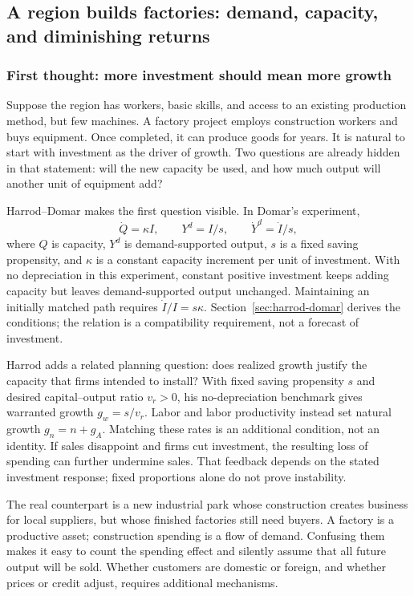 \subsection{A region builds factories: demand, capacity, and diminishing returns}

\subsubsection{First thought: more investment should mean more growth}

Suppose the region has workers, basic skills, and access to an existing
production method, but few machines. A factory project employs construction
workers and buys equipment. Once completed, it can produce goods for years.
It is natural to start with investment as the driver of growth. Two questions
are already hidden in that statement: will the new capacity be used, and how
much output will another unit of equipment add?

Harrod--Domar makes the first question visible. In Domar's experiment,
\[
\dot Q=\kappa I,\qquad Y^d=I/s,\qquad \dot Y^d=\dot I/s,
\]
where $Q$ is capacity, $Y^d$ is demand-supported output, $s$ is a fixed
saving propensity, and $\kappa$ is a constant capacity increment per unit of
investment. With no depreciation in this experiment, constant positive
investment keeps adding capacity but leaves demand-supported output
unchanged. Maintaining an initially matched path requires
$\dot I/I=s\kappa$. Section~\ref{sec:harrod-domar} derives the conditions;
the relation is a compatibility requirement, not a forecast of investment.

Harrod adds a related planning question: does realized growth justify the
capacity that firms intended to install? With fixed saving propensity $s$
and desired capital--output ratio $v_r>0$, his no-depreciation benchmark
gives warranted growth $g_w=s/v_r$. Labor and labor productivity instead
set natural growth $g_n=n+g_A$. Matching these rates is an additional
condition, not an identity. If sales disappoint and firms cut investment,
the resulting loss of spending can further undermine sales. That feedback
depends on the stated investment response; fixed proportions alone do not
prove instability.

The real counterpart is a new industrial park whose construction creates
business for local suppliers, but whose finished factories still need buyers.
A factory is a productive asset; construction spending is a flow of demand.
Confusing them makes it easy to count the spending effect and silently assume
that all future output will be sold. Whether customers are domestic or foreign,
and whether prices or credit adjust, requires additional mechanisms.

